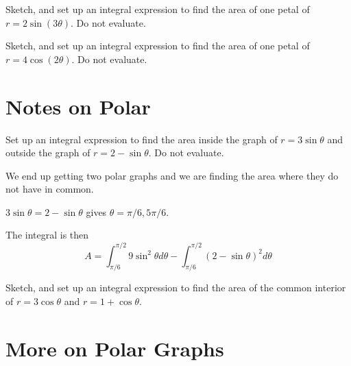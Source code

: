 \documentclass[../bccalc.tex]{subfiles}
\begin{document}
\ex Sketch, and set up an integral expression to find the area of one petal of $r=2\sin(3\theta)$. Do not evaluate.

\ex Sketch, and set up an integral expression to find the area of one petal of $r=4\cos(2\theta)$. Do not evaluate.

\section{Notes on Polar}
\begin{example}
    Set up an integral expression to find the area inside the graph of $r=3\sin\theta$ and outside the graph of $r=2-\sin\theta$. Do not evaluate.

    We end up getting two polar graphs and we are finding the area where they do not have in common.

    $3\sin\theta = 2-\sin\theta$ gives $\theta = \pi/6, 5\pi/6$.

    The integral is then 
    \[ A = \int_{\pi/6}^{\pi/2}9\sin^2 \theta d\theta - \int_{\pi/6}^{\pi/2}(2-\sin\theta)^2 d\theta \]
\end{example}

\ex Sketch, and set up an integral expression to find the area of the common interior of $r=3\cos\theta$ and $r=1+\cos\theta$.

\pagebreak
\section{More on Polar Graphs}
\end{document}
